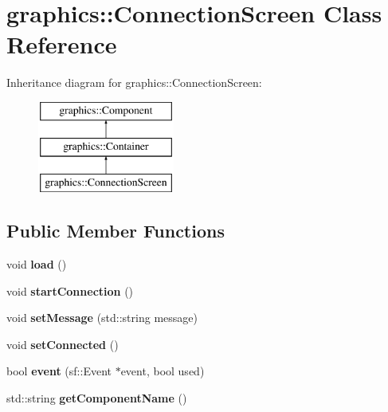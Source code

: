 \hypertarget{classgraphics_1_1_connection_screen}{\section{graphics\-:\-:Connection\-Screen Class Reference}
\label{classgraphics_1_1_connection_screen}
}
Inheritance diagram for graphics\-:\-:Connection\-Screen\-:\begin{figure}[H]
\begin{center}
\leavevmode
\includegraphics[height=3.000000cm]{classgraphics_1_1_connection_screen}
\end{center}
\end{figure}
\subsection*{Public Member Functions}
\begin{DoxyCompactItemize}
\item 
\hypertarget{classgraphics_1_1_connection_screen_a1b082fa897454bc5d74f776ed0ec805b}{void {\bfseries load} ()}\label{classgraphics_1_1_connection_screen_a1b082fa897454bc5d74f776ed0ec805b}

\item 
\hypertarget{classgraphics_1_1_connection_screen_a5fcac784572733933ca8622274066d84}{void {\bfseries start\-Connection} ()}\label{classgraphics_1_1_connection_screen_a5fcac784572733933ca8622274066d84}

\item 
\hypertarget{classgraphics_1_1_connection_screen_ac58ab2186494b2c461b2d442bf333a44}{void {\bfseries set\-Message} (std\-::string message)}\label{classgraphics_1_1_connection_screen_ac58ab2186494b2c461b2d442bf333a44}

\item 
\hypertarget{classgraphics_1_1_connection_screen_ad6353ede8f386ed4b375131c90ace6b4}{void {\bfseries set\-Connected} ()}\label{classgraphics_1_1_connection_screen_ad6353ede8f386ed4b375131c90ace6b4}

\item 
\hypertarget{classgraphics_1_1_connection_screen_af28decf04240ce56f3e21a5d622c2653}{bool {\bfseries event} (sf\-::\-Event $\ast$event, bool used)}\label{classgraphics_1_1_connection_screen_af28decf04240ce56f3e21a5d622c2653}

\item 
\hypertarget{classgraphics_1_1_connection_screen_ad56414b9204da737bdf016f66b9a002a}{std\-::string {\bfseries get\-Component\-Name} ()}\label{classgraphics_1_1_connection_screen_ad56414b9204da737bdf016f66b9a002a}

\end{DoxyCompactItemize}
